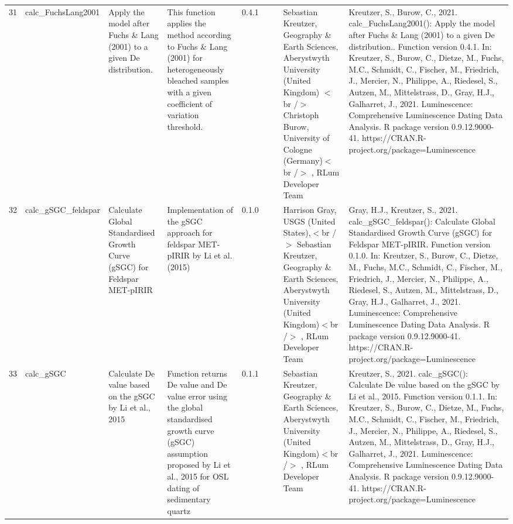 \begin{table}[ht]
\begin{tabular}{rllllllll}
 \\ 
  31 & calc\_FuchsLang2001 & Apply the model after Fuchs \& Lang (2001) to a given De distribution. & This function applies the method according to Fuchs \& Lang (2001) for heterogeneously bleached samples with a given coefficient of variation threshold. & 0.4.1
 &  &  & Sebastian Kreutzer, Geography \& Earth Sciences, Aberystwyth University (United Kingdom)  $<$br /$>$ Christoph Burow, University of Cologne (Germany)$<$br /$>$ , RLum Developer Team & Kreutzer, S., Burow, C., 2021. calc\_FuchsLang2001(): Apply the model after Fuchs \& Lang (2001) to a given De distribution.. Function version 0.4.1. In: Kreutzer, S., Burow, C., Dietze, M., Fuchs, M.C., Schmidt, C., Fischer, M., Friedrich, J., Mercier, N., Philippe, A., Riedesel, S., Autzen, M., Mittelstrass, D., Gray, H.J., Galharret, J., 2021. Luminescence: Comprehensive Luminescence Dating Data Analysis. R package version 0.9.12.9000-41. https://CRAN.R-project.org/package=Luminescence
 \\ 
  32 & calc\_gSGC\_feldspar & Calculate Global Standardised Growth Curve (gSGC) for Feldspar MET-pIRIR & Implementation of the gSGC approach for feldspar MET-pIRIR by Li et al. (2015) & 0.1.0
 &  &  & Harrison Gray, USGS (United States),$<$br /$>$ Sebastian Kreutzer, Geography \& Earth Sciences, Aberystwyth University (United Kingdom)$<$br /$>$ , RLum Developer Team & Gray, H.J., Kreutzer, S., 2021. calc\_gSGC\_feldspar(): Calculate Global Standardised Growth Curve (gSGC) for Feldspar MET-pIRIR. Function version 0.1.0. In: Kreutzer, S., Burow, C., Dietze, M., Fuchs, M.C., Schmidt, C., Fischer, M., Friedrich, J., Mercier, N., Philippe, A., Riedesel, S., Autzen, M., Mittelstrass, D., Gray, H.J., Galharret, J., 2021. Luminescence: Comprehensive Luminescence Dating Data Analysis. R package version 0.9.12.9000-41. https://CRAN.R-project.org/package=Luminescence
 \\ 
  33 & calc\_gSGC & Calculate De value based on the gSGC by Li et al., 2015 & Function returns De value and De value error using the global standardised growth curve (gSGC) assumption proposed by Li et al., 2015 for OSL dating of sedimentary quartz & 0.1.1
 &  &  & Sebastian Kreutzer, Geography \& Earth Sciences, Aberystwyth University (United Kingdom)$<$br /$>$ , RLum Developer Team & Kreutzer, S., 2021. calc\_gSGC(): Calculate De value based on the gSGC by Li et al., 2015. Function version 0.1.1. In: Kreutzer, S., Burow, C., Dietze, M., Fuchs, M.C., Schmidt, C., Fischer, M., Friedrich, J., Mercier, N., Philippe, A., Riedesel, S., Autzen, M., Mittelstrass, D., Gray, H.J., Galharret, J., 2021. Luminescence: Comprehensive Luminescence Dating Data Analysis. R package version 0.9.12.9000-41. https://CRAN.R-project.org/package=Luminescence

\end{tabular}
\end{table}
